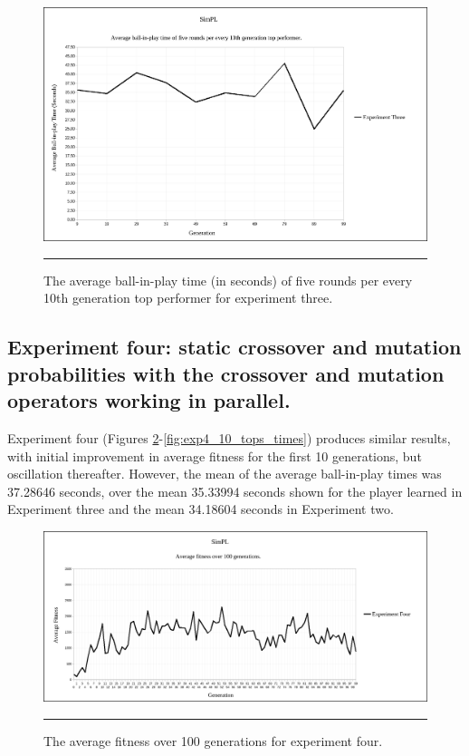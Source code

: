 \begin{figure}[ht!]  
  \centering
  \includegraphics[width=5in]{../Figures/Chapter3/exp3_10_tops_times.png}
  \rule{35em}{0.5pt}
  \caption[Experiment Three Top Performers Tournament]{The average ball-in-play time (in seconds) of five rounds per every 10th generation top performer for experiment three.}
  \label{fig:exp3_10_tops_times}
\end{figure}

\subsection[Experiment Four]{Experiment four: static crossover and mutation probabilities with the crossover and mutation operators working in parallel.}

Experiment four (Figures \ref{fig:exp4_avg_fit}-\ref{fig:exp4_10_tops_times}) produces similar results, with initial improvement in average fitness for the first 10 generations, but oscillation thereafter. However, the mean of the average ball-in-play times was 37.28646 seconds, over the mean 35.33994 seconds shown for the player learned in Experiment three and the mean 34.18604 seconds in Experiment two.

\begin{figure}[ht!]  
  \centering
  \includegraphics[width=5in]{../Figures/Chapter3/exp4_avg_fit.png}
  \rule{35em}{0.5pt}
  \caption[Experiment Four Average Fitness]{The average fitness over 100 generations for experiment four.}
  \label{fig:exp4_avg_fit}
\end{figure}

